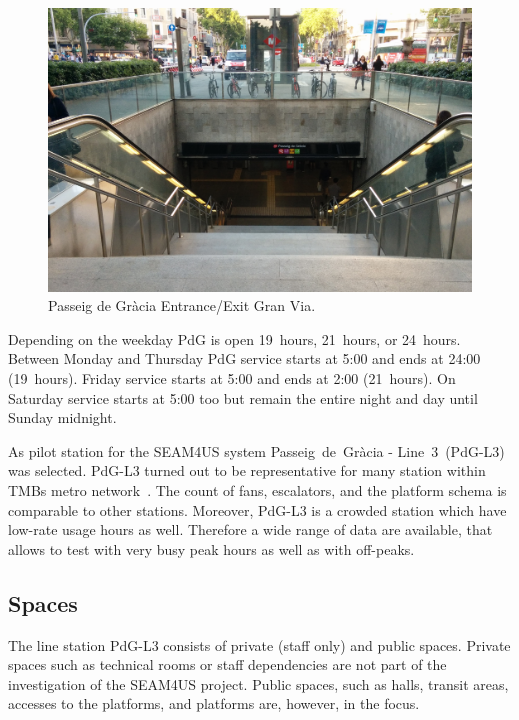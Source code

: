 \begin{figure}%
  \centering
  \includegraphics[width=\linewidth]{Figures/PdG-L3_entranceExit.jpg} 
  \caption{Passeig de Gr\`{a}cia Entrance/Exit Gran Via. \cite{TMB_2014}}
  \label{fig:PdG_entranceExit}
\end{figure}

Depending on the weekday PdG is open 19~hours, 21~hours, or 24~hours. Between Monday and Thursday PdG service starts at 5:00 and ends at 24:00 (19~hours). Friday service starts at 5:00 and ends at 2:00 (21~hours). On Saturday service starts at 5:00 too but remain the entire night and day until Sunday midnight.

As pilot station for the SEAM4US system Passeig~de~Gr\`{a}cia - Line~3~(PdG-L3) was selected. PdG-L3 turned out to be representative for many station within TMBs metro network~\cite{TMB_2014}. The count of fans, escalators, and the platform schema is comparable to other stations. Moreover, PdG-L3 is a crowded station which have low-rate usage hours as well. Therefore a wide range of data are available, that allows to test with very busy peak hours as well as with off-peaks.


\subsection{Spaces}
\label{subsec:PdG-L3_spaces}

The line station PdG-L3 consists of private (staff only) and public spaces. Private spaces such as technical rooms or staff dependencies are not part of the investigation of the SEAM4US project. Public spaces, such as halls, transit areas, accesses to the platforms, and platforms are, however, in the focus.

